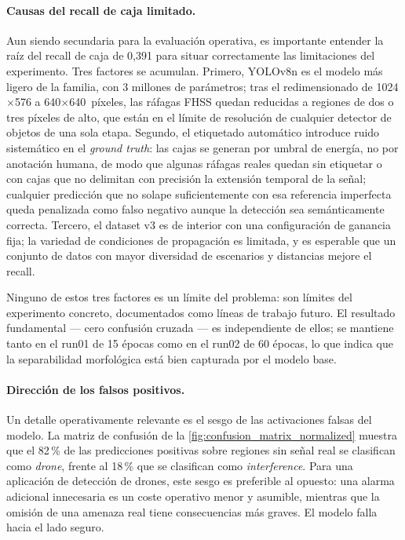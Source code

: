 \paragraph{Causas del recall de caja limitado.}
Aun siendo secundaria para la evaluación operativa, es importante entender la raíz del recall de caja de 0,391 para situar correctamente las limitaciones del experimento. Tres factores se acumulan. Primero, YOLOv8n es el modelo más ligero de la familia, con \num{3} millones de parámetros; tras el redimensionado de \num{1024}$\times$\num{576} a \num{640}$\times$\num{640}~píxeles, las ráfagas FHSS quedan reducidas a regiones de dos o tres píxeles de alto, que están en el límite de resolución de cualquier detector de objetos de una sola etapa. Segundo, el etiquetado automático introduce ruido sistemático en el \emph{ground truth}: las cajas se generan por umbral de energía, no por anotación humana, de modo que algunas ráfagas reales quedan sin etiquetar o con cajas que no delimitan con precisión la extensión temporal de la señal; cualquier predicción que no solape suficientemente con esa referencia imperfecta queda penalizada como falso negativo aunque la detección sea semánticamente correcta. Tercero, el dataset v3 es de interior con una configuración de ganancia fija; la variedad de condiciones de propagación es limitada, y es esperable que un conjunto de datos con mayor diversidad de escenarios y distancias mejore el recall.

Ninguno de estos tres factores es un límite del problema: son límites del experimento concreto, documentados como líneas de trabajo futuro. El resultado fundamental --- cero confusión cruzada --- es independiente de ellos; se mantiene tanto en el run01 de 15 épocas como en el run02 de 60 épocas, lo que indica que la separabilidad morfológica está bien capturada por el modelo base.

\paragraph{Dirección de los falsos positivos.}
Un detalle operativamente relevante es el sesgo de las activaciones falsas del modelo. La matriz de confusión de la \cref{fig:confusion_matrix_normalized} muestra que el 82\,\% de las predicciones positivas sobre regiones sin señal real se clasifican como \emph{drone}, frente al 18\,\% que se clasifican como \emph{interference}. Para una aplicación de detección de drones, este sesgo es preferible al opuesto: una alarma adicional innecesaria es un coste operativo menor y asumible, mientras que la omisión de una amenaza real tiene consecuencias más graves. El modelo falla hacia el lado seguro.

